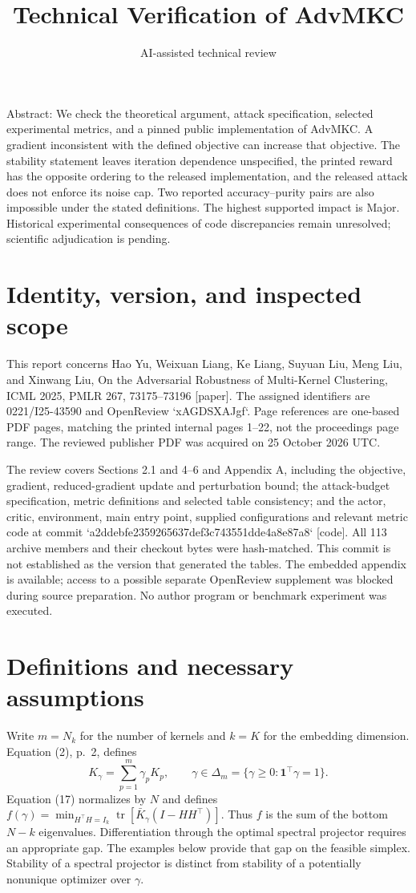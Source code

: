 \documentclass[10pt]{article}
\title{Technical Verification of AdvMKC}
\author{AI-assisted technical review}
\date{}
\begin{document}
\maketitle
Abstract: We check the theoretical argument, attack specification, selected experimental metrics, and a pinned public implementation of AdvMKC. A gradient inconsistent with the defined objective can increase that objective. The stability statement leaves iteration dependence unspecified, the printed reward has the opposite ordering to the released implementation, and the released attack does not enforce its noise cap. Two reported accuracy–purity pairs are also impossible under the stated definitions. The highest supported impact is Major. Historical experimental consequences of code discrepancies remain unresolved; scientific adjudication is pending.\par
\section*{Identity, version, and inspected scope}
This report concerns Hao Yu, Weixuan Liang, Ke Liang, Suyuan Liu, Meng Liu, and Xinwang Liu, On the Adversarial Robustness of Multi-Kernel Clustering, ICML 2025, PMLR 267, 73175–73196 [paper]. The assigned identifiers are 0221/I25-43590 and OpenReview `xAGDSXAJgf`. Page references are one-based PDF pages, matching the printed internal pages 1–22, not the proceedings page range. The reviewed publisher PDF was acquired on 25 October 2026 UTC.\par
The review covers Sections 2.1 and 4–6 and Appendix A, including the objective, gradient, reduced-gradient update and perturbation bound; the attack-budget specification, metric definitions and selected table consistency; and the actor, critic, environment, main entry point, supplied configurations and relevant metric code at commit `a2ddebfe2359265637def3c743551dde4a8e87a8` [code]. All 113 archive members and their checkout bytes were hash-matched. This commit is not established as the version that generated the tables. The embedded appendix is available; access to a possible separate OpenReview supplement was blocked during source preparation. No author program or benchmark experiment was executed.\par
\section*{Definitions and necessary assumptions}
Write \(m=N_k\) for the number of kernels and \(k=K\) for the embedding dimension. Equation (2), p. 2, defines \[K_\gamma=\sum_{p=1}^m\gamma_pK_p,\qquad
 \gamma\in\Delta_m=\{\gamma\geq0:\mathbf1^\top\gamma=1\}.\] Equation (17) normalizes by \(N\) and defines \(f(\gamma)=\min_{H^\top H=I_k}\operatorname{tr}
[\bar K_\gamma(I-HH^\top)]\). Thus \(f\) is the sum of the bottom \(N-k\) eigenvalues. Differentiation through the optimal spectral projector requires an appropriate gap. The examples below provide that gap on the feasible simplex. Stability of a spectral projector is distinct from stability of a potentially nonunique optimizer over \(\gamma\).\par
\end{document}
